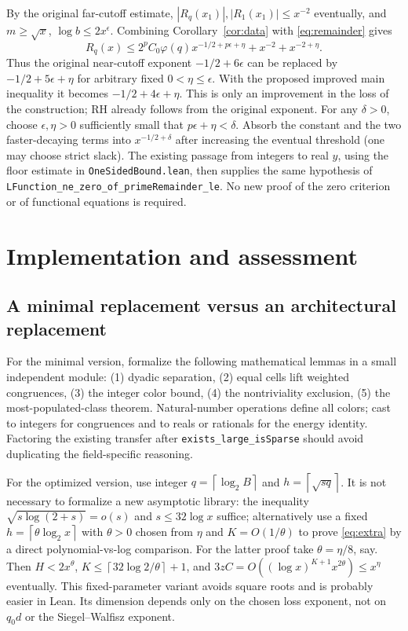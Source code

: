 \documentclass[11pt]{article}
\theoremstyle{remark}\newtheorem{remark}[theorem]{Remark}
\newcommand{\ceil}[1]{\left\lceil #1\right\rceil}
\newcommand{\src}[1]{\texttt{#1}}
\begin{document}
By the original far-cutoff estimate, $|R_q(x_1)|,|R_1(x_1)|\le x^{-2}$ eventually, and $m\ge\sqrt x$, $\log b\le2x^\epsilon$. Combining Corollary~\ref{cor:data} with \eqref{eq:remainder} gives
\begin{equation}\label{eq:newnear}
 R_q(x)\le 2^p C_0\varphi(q)x^{-1/2+p\epsilon+\eta}
             +x^{-2}+x^{-2+\eta}.
\end{equation}
Thus the original near-cutoff exponent $-1/2+6\epsilon$ can be replaced by $-1/2+5\epsilon+\eta$ for arbitrary fixed $0<\eta\le\epsilon$. With the proposed improved main inequality it becomes $-1/2+4\epsilon+\eta$. This is only an improvement in the loss of the construction; RH already follows from the original exponent. For any $\delta>0$, choose $\epsilon,\eta>0$ sufficiently small that $p\epsilon+\eta<\delta$. Absorb the constant and the two faster-decaying terms into $x^{-1/2+\delta}$ after increasing the eventual threshold (one may choose strict slack). The existing passage from integers to real $y$, using the floor estimate in \src{OneSidedBound.lean}, then supplies the same hypothesis of \src{LFunction\_ne\_zero\_of\_primeRemainder\_le}. No new proof of the zero criterion or of functional equations is required.

\section{Implementation and assessment}\label{sec:implementation}
\subsection{A minimal replacement versus an architectural replacement}
For the minimal version, formalize the following mathematical lemmas in a small independent module: (1) dyadic separation, (2) equal cells lift weighted congruences, (3) the integer color bound, (4) the nontriviality exclusion, (5) the most-populated-class theorem. Natural-number operations define all colors; cast to integers for congruences and to reals or rationals for the energy identity. Factoring the existing transfer after \src{exists\_large\_isSparse} should avoid duplicating the field-specific reasoning.

For the optimized version, use integer $q=\ceil{\log_2 B}$ and $h=\ceil{\sqrt{s q}}$. It is not necessary to formalize a new asymptotic library: the inequality $\sqrt{s\log(2+s)}=o(s)$ and $s\le32\log x$ suffice; alternatively use a fixed $h=\ceil{\theta\log_2 x}$ with $\theta>0$ chosen from $\eta$ and $K=O(1/\theta)$ to prove \eqref{eq:extra} by a direct polynomial-vs-log comparison. For the latter proof take $\theta=\eta/8$, say. Then $H<2x^\theta$, $K\le\ceil{32\log 2/\theta}+1$, and $3zC=O((\log x)^{K+1} x^{2\theta})\le x^\eta$ eventually. This fixed-parameter variant avoids square roots and is probably easier in Lean. Its dimension depends only on the chosen loss exponent, not on $q_0d$ or the Siegel--Walfisz exponent.
\end{document}
